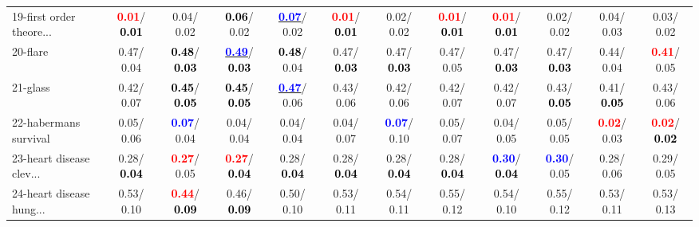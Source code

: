 \begin{table}[h]
\begin{center}
{\begin{tabular}{lc|c|c|c|c|c|c|c|c|c|c}
19-first order theore... & \textcolor{red}{\textbf{  0.01}}/\textcolor{black}{\textbf{  0.01}} &   0.04/  0.02 & \textcolor{black}{\textbf{  0.06}}/  0.02 & \underline{\textcolor{blue}{\textbf{  0.07}}}/  0.02 & \textcolor{red}{\textbf{  0.01}}/\textcolor{black}{\textbf{  0.01}} &   0.02/  0.02 & \textcolor{red}{\textbf{  0.01}}/\textcolor{black}{\textbf{  0.01}} & \textcolor{red}{\textbf{  0.01}}/\textcolor{black}{\textbf{  0.01}} &   0.02/  0.02 &   0.04/  0.03 &   0.03/  0.02 \\
20-flare &   0.47/  0.04 & \textcolor{black}{\textbf{  0.48}}/\textcolor{black}{\textbf{  0.03}} & \underline{\textcolor{blue}{\textbf{  0.49}}}/\textcolor{black}{\textbf{  0.03}} & \textcolor{black}{\textbf{  0.48}}/  0.04 &   0.47/\textcolor{black}{\textbf{  0.03}} &   0.47/\textcolor{black}{\textbf{  0.03}} &   0.47/  0.05 &   0.47/\textcolor{black}{\textbf{  0.03}} &   0.47/\textcolor{black}{\textbf{  0.03}} &   0.44/  0.04 & \textcolor{red}{\textbf{  0.41}}/  0.05 \\
21-glass &   0.42/  0.07 & \textcolor{black}{\textbf{  0.45}}/\textcolor{black}{\textbf{  0.05}} & \textcolor{black}{\textbf{  0.45}}/\textcolor{black}{\textbf{  0.05}} & \underline{\textcolor{blue}{\textbf{  0.47}}}/  0.06 &   0.43/  0.06 &   0.42/  0.06 &   0.42/  0.07 &   0.42/  0.07 &   0.43/\textcolor{black}{\textbf{  0.05}} &   0.41/\textcolor{black}{\textbf{  0.05}} &   0.43/  0.06 \\ \hline
22-habermans survival &   0.05/  0.06 & \textcolor{blue}{\textbf{  0.07}}/  0.04 &   0.04/  0.04 &   0.04/  0.04 &   0.04/  0.07 & \textcolor{blue}{\textbf{  0.07}}/  0.10 &   0.05/  0.07 &   0.04/  0.05 &   0.05/  0.05 & \textcolor{red}{\textbf{  0.02}}/  0.03 & \textcolor{red}{\textbf{  0.02}}/\textcolor{black}{\textbf{  0.02}} \\
23-heart disease clev... &   0.28/\textcolor{black}{\textbf{  0.04}} & \textcolor{red}{\textbf{  0.27}}/  0.05 & \textcolor{red}{\textbf{  0.27}}/\textcolor{black}{\textbf{  0.04}} &   0.28/\textcolor{black}{\textbf{  0.04}} &   0.28/\textcolor{black}{\textbf{  0.04}} &   0.28/\textcolor{black}{\textbf{  0.04}} &   0.28/\textcolor{black}{\textbf{  0.04}} & \textcolor{blue}{\textbf{  0.30}}/\textcolor{black}{\textbf{  0.04}} & \textcolor{blue}{\textbf{  0.30}}/  0.05 &   0.28/  0.06 &   0.29/  0.05 \\
24-heart disease hung... &   0.53/  0.10 & \textcolor{red}{\textbf{  0.44}}/\textcolor{black}{\textbf{  0.09}} &   0.46/\textcolor{black}{\textbf{  0.09}} &   0.50/  0.10 &   0.53/  0.11 &   0.54/  0.11 &   0.55/  0.12 &   0.54/  0.10 &   0.55/  0.12 &   0.53/  0.11 &   0.53/  0.13 \\

\end{tabular}}
\end{center}
\end{table}
